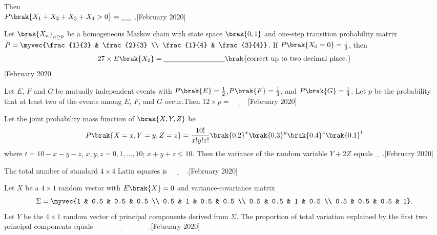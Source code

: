     Then
    \\$P\brak{X_1 + X_2 + X_3 + X_4 > 0} = \underline{\hspace{0.5cm}}$ .\hfill[February 2020]
    \item Let $\brak{X_n}_{n \geq 0}$ be a homogeneous Markov chain with state space $\brak{0,1}$ and one-step transition probability matrix $P = \myvec{\frac{1}{3} & \frac{2}{3} \\ \frac{1}{4} & \frac{3}{4}}$. If $P\brak{X_0 = 0} = \frac{1}{3}$, then
    \begin{align}
    27 \times E\brak{X_2} = \underline{\hspace{3cm}} \brak{\text{correct up to two decimal place.}}
    \end{align}\hfill[February 2020]
     \item Let $E$, $F$ and $G$ be mutually independent events with $P\brak{E}=\frac{1}{2}$,$P\brak{F} = \frac{1}{3}$, and $P\brak{G}=\frac{1}{4}$. Let $p$ be the probability that at least two of the events among $E$, $F$, and $G$ occur.Then $12 \times p = \underline{\hspace{1cm}}$\hfill[February 2020]
     \item Let the joint probability mass function of $\brak{X, Y, Z}$ be
    \begin{align}
    P\brak{X = x, Y = y, Z = z} = \frac{10!}{x! y! z!} \brak{0.2}^x \brak{0.3}^y \brak{0.4}^z \brak{0.1}^t
    \end{align}
    where $t = 10 - x - y - z$, $x, y, z = 0, 1, \dots, 10$; $x + y + z \leq 10$.
    Then the variance of the random variable $Y + 2Z$ equals $\underline{\hspace{0.2cm}}$ .\hfill[February 2020]
    \item The total number of standard $4 \times 4$ Latin squares is $\underline{\hspace{1cm}}$.\hfill[February 2020]
     \item Let $X$ be a $4 \times 1$ random vector with ${E}\brak{X} = 0$ and variance-covariance matrix
    \begin{align}
    \Sigma = \myvec{1 & 0.5 & 0.5 & 0.5 \\ 0.5 & 1 & 0.5 & 0.5 \\ 0.5 & 0.5 & 1 & 0.5 \\ 0.5 & 0.5 & 0.5 & 1}.
    \end{align}
    Let $Y$ be the $4 \times 1$ random vector of principal components derived from $\Sigma$. The proportion of total variation explained by the first two principal components equals $\underline{\hspace{3cm}}$ .\hfill[February 2020]
